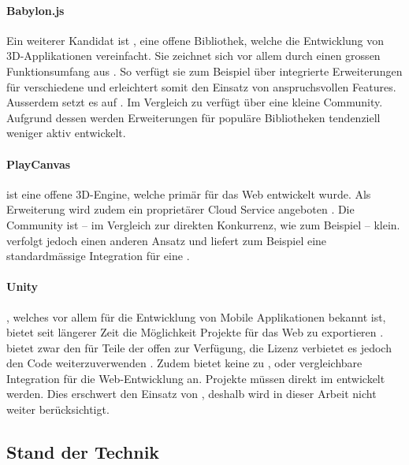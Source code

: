\paragraph{Babylon.js}
Ein weiterer Kandidat ist , eine offene Bibliothek, welche die Entwicklung von 3D-Applikationen vereinfacht. Sie zeichnet sich vor allem durch einen grossen Funktionsumfang aus \cite{babylonjsNpmPackage}. So verfügt sie zum Beispiel über integrierte Erweiterungen für verschiedene  und erleichtert somit den Einsatz von anspruchsvollen Features. Ausserdem setzt es auf .
Im Vergleich zu  verfügt  über eine kleine Community. Aufgrund dessen werden Erweiterungen für populäre Bibliotheken tendenziell weniger aktiv entwickelt.

\paragraph{PlayCanvas}
 ist eine offene 3D-Engine, welche primär für das Web entwickelt wurde. Als Erweiterung wird zudem ein proprietärer Cloud Service angeboten \cite{playcanvasNpmPackage}. Die Community ist – im Vergleich zur direkten Konkurrenz, wie zum Beispiel  – klein.  verfolgt jedoch einen anderen Ansatz und liefert zum Beispiel eine standardmässige Integration für eine .

\paragraph{Unity}
, welches vor allem für die Entwicklung von Mobile Applikationen bekannt ist, bietet seit längerer Zeit die Möglichkeit Projekte für das Web zu exportieren \cite{unityWeb}.
 bietet zwar den  für Teile der  offen zur Verfügung, die Lizenz verbietet es jedoch den Code weiterzuverwenden \cite{unityOpenSource}.
Zudem bietet  keine zu ,  oder  vergleichbare Integration für die Web-Entwicklung an.  Projekte müssen direkt im  entwickelt werden. Dies erschwert den Einsatz von , deshalb wird   in dieser Arbeit nicht weiter berücksichtigt.

\subsection{Stand der Technik}

